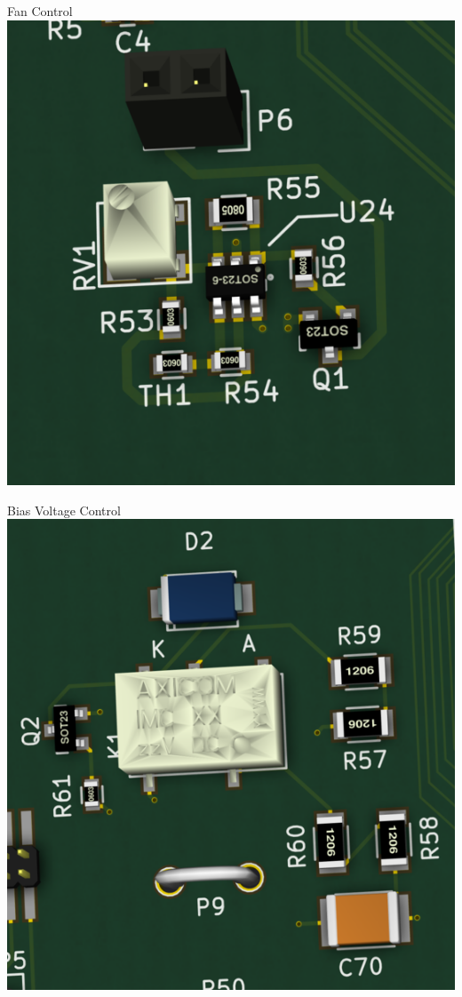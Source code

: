 \documentclass{beamer}
\begin{document}
\begin{frame}{Fan Control}
  \centering
  \includegraphics[height=\textheight]{figures/DAQCard2015_Fan_Control_small}
\end{frame}

\begin{frame}{Bias Voltage Control}
  \centering
  \includegraphics[height=\textheight]{figures/DAQCard2015_HV_small}
\end{frame}
\end{document}
